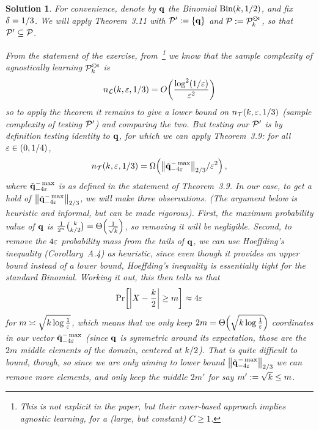 \documentclass[biber]{nowfnt} %
\newtheorem{solution}{Solution}[chapter]
\begin{document}
\begin{solution}
For convenience, denote by $\mathbf{q}$ the Binomial $\binomial{\ab}{1/2}$, and fix $\delta = 1/3$. We will apply Theorem~3.11 with $\mathcal{P}' := \{\mathbf{q}\}$ and $\mathcal{P} := \mathcal{P}^{\hspace{1pt}{\cdot}\kern -4pt {\subset}\kern -3pt {\rtimes}}_{k}$, so that $\mathcal{P}' \subseteq \mathcal{P}$.

From the statement of the exercise, from~\citep{DDS:PBD:15}\footnote{This is not explicit in the paper, but their cover-based approach implies agnostic learning, for a (large, but constant) $C\geq 1$.} we know that the sample complexity of agnostically learning $\mathcal{P}^{\hspace{1pt}{\cdot}\kern -4pt {\subset}\kern -3pt {\rtimes}}_{k}$ is
\[
	\ns_{\mathcal{L}}(\ab,\dst,1/3) = \bigO{\frac{\log^2(1/\dst)}{\dst^2}}
\]
so to apply the theorem it remains to give a lower bound on $n_{\mathcal{T}}(k,\varepsilon,1/3)$ (sample complexity of testing $\mathcal{P}'$) and comparing the two. But testing our $\mathcal{P}'$ is by definition testing identity to $\mathbf{q}$, for which we can apply Theorem~3.9: for all $\varepsilon\in(0,1/4)$, 
\[
		\ns_{\mathcal{T}}(\ab,\dst,1/3) = \bigOmega{\norm{\tilde{\q}^{-\max}_{-4\dst}}_{2/3}/\dst^2}\,,
\]
where $\tilde{\mathbf{q}}^{-\max}_{-4\varepsilon}$ is as defined in the statement of Theorem~3.9. In our case, to get a hold of 
$
	\norm{\tilde{\q}^{-\max}_{-4\dst}}_{2/3}
$, we will make three observations. \emph{(The argument below is heuristic and informal, but can be made rigorous).} First, the maximum probability value of $\mathbf{q}$ is $\frac{1}{2^n}\binom{\ab}{\ab/2} = \bigTheta{\frac{1}{\sqrt{\ab}}}$, so removing it will be negligible. Second, to remove the $4\varepsilon$ probability mass from the tails of $\mathbf{q}$, we can use Hoeffding's inequality (Corollary~A.4) as heuristic, since even though it provides an upper bound instead of a lower bound, Hoeffding's inequality is essentially tight for the standard Binomial. Working it out, this then tells us that
\[
	\bPr{ \abs{X - \frac{\ab}{2}} \geq m } \approx 4\dst 
\]
for $m \asymp \sqrt{k \log\frac{1}{\varepsilon}}$, which means that we only keep $2m = \bigTheta{\sqrt{\ab \log\frac{1}{\dst}}}$ coordinates in our vector $\tilde{\mathbf{q}}^{-\max}_{-4\varepsilon}$ (since $\mathbf{q}$ is symmetric around its expectation, those are the $2m$ middle elements of the domain, centered at $k/2$). That is quite difficult to bound, though, so since we are only aiming to \emph{lower bound} $\norm{\tilde{\q}^{-\max}_{-4\dst}}_{2/3}$ we can remove more elements, and only keep the middle $2m'$ for say $m' := \sqrt{k} \leq m$.



\end{solution}
\end{document}
